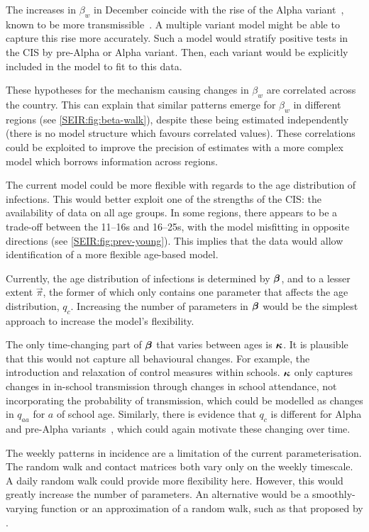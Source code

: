 \documentclass[thesis.tex]{subfiles}
\begin{document}
The increases in $\beta_w$ in December coincide with the rise of the Alpha variant~\autocite{lythgoeLineage}, known to be more transmissible~\autocite[e.g.][]{daviesEstimated}.
A multiple variant model might be able to capture this rise more accurately.
Such a model would stratify positive tests in the CIS by pre-Alpha or Alpha variant.
Then, each variant would be explicitly included in the model to fit to this data.

These hypotheses for the mechanism causing changes in $\beta_w$ are correlated across the country.
This can explain that similar patterns emerge for $\beta_w$ in different regions (see \cref{SEIR:fig:beta-walk}), despite these being estimated independently (\ie there is no model structure which favours correlated values).
These correlations could be exploited to improve the precision of estimates with a more complex model which borrows information across regions.

The current model could be more flexible with regards to the age distribution of infections.
This would better exploit one of the strengths of the CIS: the availability of data  on all age groups.
In some regions, there appears to be a trade-off between the 11--16s and 16--25s, with the model misfitting in opposite directions (see \cref{SEIR:fig:prev-young}).
This implies that the data would allow identification of a more flexible age-based model.

Currently, the age distribution of infections is determined by $\bm{\beta}$, and to a lesser extent $\vec{\pi}$, the former of which only contains one parameter that affects the age distribution, $q_c$.
Increasing the number of parameters in $\bm{\beta}$ would be the simplest approach to increase the model's flexibility.

The only time-changing part of $\bm{\beta}$ that varies between ages is $\bm{\kappa}$.
It is plausible that this would not capture all behavioural changes.
For example, the introduction and relaxation of control measures within schools.
$\bm{\kappa}$ only captures changes in in-school transmission through changes in school attendance, not incorporating the probability of transmission, which could be modelled as changes in $q_{aa}$ for $a$ of school age.
Similarly, there is evidence that $q_c$ is different for Alpha and pre-Alpha variants~\autocite{zhuRole}, which could again motivate these changing over time.

The weekly patterns in incidence are a limitation of the current parameterisation.
The random walk and contact matrices both vary only on the weekly timescale.
A daily random walk could provide more flexibility here.
However, this would greatly increase the number of parameters.
An alternative would be a smoothly-varying function or an approximation of a random walk, such as that proposed by \textcite{ghoshApproximate}.
\end{document}
